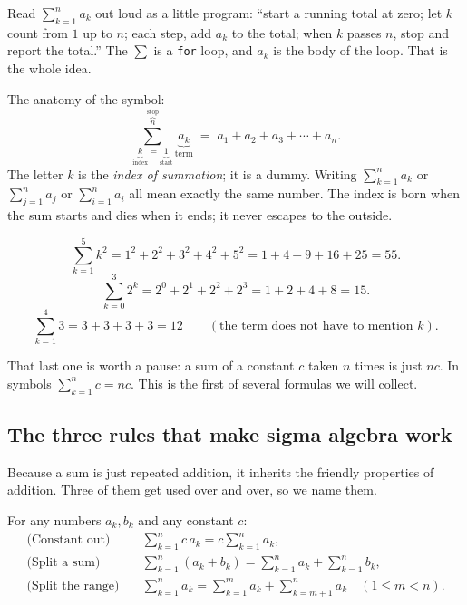 \begin{intuitionbox}
Read $\displaystyle\sum_{k=1}^{n} a_k$ out loud as a little program: ``start a running total at zero;
let $k$ count from $1$ up to $n$; each step, add $a_k$ to the total; when $k$ passes $n$, stop and
report the total.'' The $\sum$ is a \texttt{for} loop, and $a_k$ is the body of the loop. That is the
whole idea.
\end{intuitionbox}

The anatomy of the symbol:
\[
\sum_{\underbrace{k}_{\text{index}}=\underbrace{1}_{\text{start}}}^{\overbrace{n}^{\text{stop}}}
\underbrace{a_k}_{\text{term}}
\;=\; a_1 + a_2 + a_3 + \cdots + a_n.
\]
The letter $k$ is the \emph{index of summation}; it is a dummy. Writing $\sum_{k=1}^{n} a_k$ or
$\sum_{j=1}^{n} a_j$ or $\sum_{i=1}^{n} a_i$ all mean exactly the same number. The index is born when
the sum starts and dies when it ends; it never escapes to the outside.

\begin{example}
\label{ch39:ex-unroll}
\[
\sum_{k=1}^{5} k^2 = 1^2 + 2^2 + 3^2 + 4^2 + 5^2 = 1+4+9+16+25 = 55.
\]
\[
\sum_{k=0}^{3} 2^k = 2^0 + 2^1 + 2^2 + 2^3 = 1 + 2 + 4 + 8 = 15.
\]
\[
\sum_{k=1}^{4} 3 = 3 + 3 + 3 + 3 = 12 \qquad(\text{the term does not have to mention } k).
\]
\end{example}

That last one is worth a pause: a sum of a constant $c$ taken $n$ times is just $nc$. In symbols
$\sum_{k=1}^{n} c = nc$. This is the first of several formulas we will collect.

\subsection{The three rules that make sigma algebra work}
\label{ch39:sigma-rules}

Because a sum is just repeated addition, it inherits the friendly properties of addition. Three of
them get used over and over, so we name them.

\begin{formalbox}
For any numbers $a_k, b_k$ and any constant $c$:
\begin{align}
\text{(Constant out)}\quad & \sum_{k=1}^{n} c\,a_k = c\sum_{k=1}^{n} a_k, \label{ch39:rule-const}\\[2pt]
\text{(Split a sum)}\quad & \sum_{k=1}^{n} (a_k + b_k) = \sum_{k=1}^{n} a_k + \sum_{k=1}^{n} b_k, \label{ch39:rule-split}\\[2pt]
\text{(Split the range)}\quad & \sum_{k=1}^{n} a_k = \sum_{k=1}^{m} a_k + \sum_{k=m+1}^{n} a_k \quad (1 \le m < n). \label{ch39:rule-range}
\end{align}
\end{formalbox}

